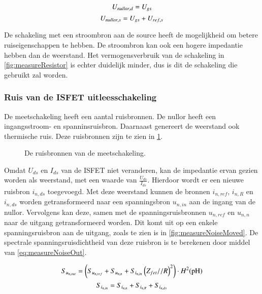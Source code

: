 \begin{equation}\label{eq:nullorVoltageDrain}
    U_{nullor,d} = U_{gs}
    \tagaddtext{[\si{\volt}]}
\end{equation}
\begin{equation}\label{eq:nullorVoltageSource}
    U_{nullor,s} = U_{gs} + U_{ref,s}
    \tagaddtext{[\si{\volt}]}
\end{equation}

De schakeling met een stroombron aan de source heeft de mogelijkheid om betere ruiseigenschappen te hebben. De stroombron kan ook een hogere impedantie hebben dan de weerstand. Het vermogensverbruik van de schakeling in \cref{fig:measureResistor} is echter duidelijk minder, dus is dit de schakeling die gebruikt zal worden.

\subsubsection{Ruis van de ISFET uitleesschakeling}

De meetschakeling heeft een aantal ruisbronnen. De nullor heeft een ingangsstroom- en spanninsruisbron. Daarnaast genereert de weerstand ook thermische ruis. Deze ruisbronnen zijn te zien in \cref{fig:measureNoise}.
\begin{figure}[!htbp]
    \centering
    \def\svgwidth{0.6\textwidth}
    
    \caption{De ruisbronnen van de meetschakeling.}
    \label{fig:measureNoise}
\end{figure}


Omdat $U_{ds}$ en $I_{ds}$ van de ISFET niet veranderen, kan de impedantie ervan gezien worden als weerstand, met een waarde van $\frac{U_{ds}}{I_{ds}}$. Hierdoor wordt er een nieuwe ruisbron $i_{n,ds}$ toegevoegd. Met deze weerstand kunnen de bronnen $i_{n,ref}$, $i_{n,R}$ en $i_{n,ds}$ worden getransformeerd naar een spanningsbron $u_{n,in}$ aan de ingang van de nullor.
Vervolgens kan deze, samen met de spanningsruisbronnen $u_{n,ref}$ en $u_{n,n}$ naar de uitgang getransformeerd worden. Dit komt uit op een enkele spanningsruisbron aan de uitgang, zoals te zien is in \cref{fig:measureNoiseMoved}. De spectrale spanningsruisdichtheid van deze ruisbron is te berekenen door middel van \cref{eq:measureNoiseOut}.

\begin{equation}\label{eq:measureNoiseOut}
    S_{u_{{n,out}}} = \left(S_{u_{{n,ref}}} + S_{u_{{n,n}}} + S_{i_{n,in}}\left(Z_{fet} // R\right)^2\right) \cdot H^2(\ph)
    \tagaddtext{[\si{\volt\squared\per\hertz}]}
\end{equation}
\begin{equation}
    S_{i_{{n,in}}} = S_{i_{{n,n}}} + S_{i_{{n,R}}} + S_{i_{{n,ds}}}
    \tagaddtext{[\si{\ampere\squared\per\hertz}]}
    \label{eq:measureNoiseCurrentIn}
\end{equation}


